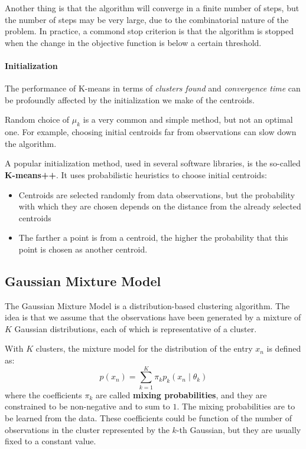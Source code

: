Another thing is that the algorithm will converge in a finite number of steps, but the number of steps may be very large, due to the combinatorial nature of the problem. In practice, a commond stop criterion is that the algorithm is stopped when the change in the objective function is below a certain threshold.

\paragraph*{Initialization}
The performance of K-means in terms of \textit{clusters found} and \textit{convergence time} can be profoundly affected by the initialization we make of the centroids.

Random choice of $\mu_k$ is a very common and simple method, but not an optimal one. For example, choosing initial centroids far from observations can slow down the algorithm.

A popular initialization method, used in several software libraries, is the so-called \textbf{K-means++}. 
It uses probabilistic heuristics to choose initial centroids:

\begin{itemize}
    \item Centroids are selected randomly from data observations, but the probability with which they are chosen depends on the distance from the already selected centroids
    \item The farther a point is from a centroid, the higher the probability that this point is chosen as another centroid.
\end{itemize}


\subsection{Gaussian Mixture Model}
The Gaussian Mixture Model is a distribution-based clustering algorithm. The idea is that we assume that the observations have been generated by a mixture of $K$ Gaussian distributions, each of which is representative of a cluster. 

With $K$ clusters, the mixture model for the distribution of the entry $x_n$ is defined as:
\[
    p(x_n) = \sum_{k=1}^{K} \pi_k p_k (x_n \mid \theta_k)
\]
where the coefficients $\pi_k$ are called \textbf{mixing probabilities}, and they are constrained to be non-negative and to sum to $1$. The mixing probabilities are to be learned from the data.
These coefficients could be function of the number of observations in the cluster represented by the $k$-th Gaussian, but they are usually fixed to a constant value.

